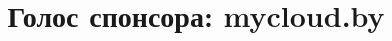 \documentclass[10pt, a5paper]{article}
\begin{document}
\title{Голос спонсора: mycloud.by}
\date{}
\maketitle

~

\newpage

~
\end{document}
